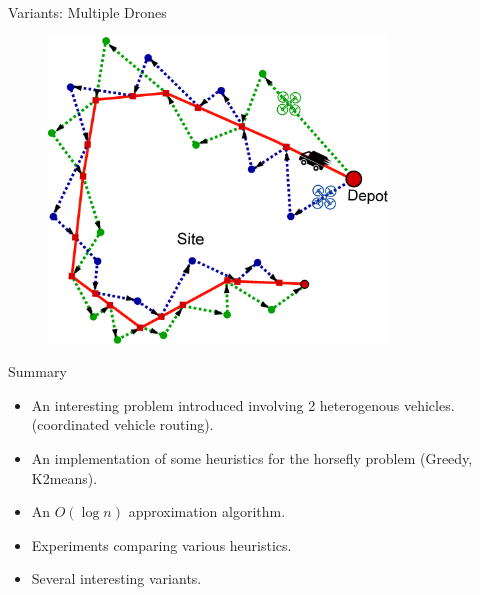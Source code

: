 \documentclass{beamer}
\begin{document}

\begin{frame}[t]{Variants: Multiple Drones}
  \vspace{-10pt}
\begin{figure}
    \centering
        \includegraphics[width=9.0cm]{slide_imgs/multiple_drones.eps}
  \end{figure}
\end{frame}


\begin{frame}{Summary}
  \begin{center}
    \begin{itemize}
      \item An interesting problem introduced involving 2 heterogenous vehicles. (coordinated vehicle routing).
      \item An implementation of some heuristics for the horsefly problem (Greedy, K2means).
      \item An $O( \log n)$ approximation algorithm. 
      \item Experiments comparing various heuristics. 
      \item Several interesting variants. 
   \end{itemize}
  \end{center}
\end{frame}
\end{document}

